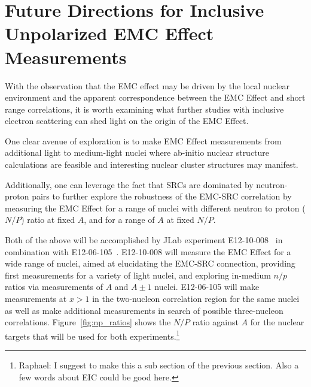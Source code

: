 \section{Future Directions for Inclusive Unpolarized EMC Effect Measurements}

With the observation that the EMC effect may be driven by the local nuclear environment
and the apparent correspondence between the EMC Effect and short range correlations, it is worth examining what
further studies with inclusive electron scattering can shed light on the origin of the EMC Effect.

One clear avenue of exploration is to make EMC Effect measurements from additional light to medium-light
nuclei where ab-initio nuclear structure calculations are feasible and interesting nuclear cluster
structures may manifest.

Additionally, one can leverage the fact that SRCs are dominated by neutron-proton pairs to further explore
the robustness of the EMC-SRC correlation by measuring the EMC Effect for a range of nuclei with
different neutron to proton ($N/P$) ratio at fixed $A$, and for a range of $A$ at fixed $N/P$.

Both of the above will be accomplished by JLab experiment E12-10-008~\cite{12gev_emc} in combination
with E12-06-105~\cite{12gev_xgt1}. E12-10-008 will measure the EMC Effect for a wide range of nuclei,
aimed at elucidating the EMC-SRC connection, providing first measurements for a variety of light nuclei,
and exploring in-medium $n/p$ ratios via measurements of $A$ and $A\pm1$ nuclei.  E12-06-105 will make
measurements at $x>1$ in the two-nucleon correlation region for the same nuclei as well as make additional
measurements in search of possible three-nucleon correlations. Figure~\ref{fig:np_ratios} shows the $N/P$
ratio against $A$ for the nuclear targets that will be used for both experiments.\footnote{Raphael: I suggest
to make this a sub section of the previous section. Also a few words about EIC could be good here.}

